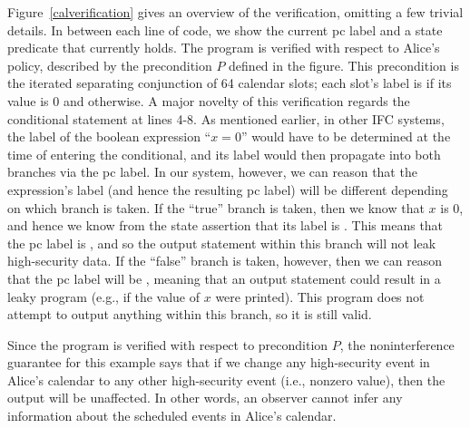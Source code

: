 Figure~\ref{calverification} gives an overview of the verification, omitting a few trivial details. In between each line of
code, we show the current pc label and a state predicate that currently holds.
The program is verified with respect to Alice's policy, described by the precondition $P$ defined in the figure. 
This precondition is the iterated separating conjunction of 64 calendar slots; each slot's label is \lo{} if its value is
0 and \hi{} otherwise. A major novelty of this verification regards the conditional statement at lines 4-8.
As mentioned earlier, in other IFC systems, the label of the boolean expression ``$x = 0$'' would have to be determined at 
the time of entering the conditional, and its label would then propagate into both branches via the pc label. In our system, 
however, we can reason that the expression's label (and hence the resulting pc label) will be 
different depending on which branch is taken. If the ``true'' branch is taken, then we know that $x$ is 0, and hence we know 
from the state assertion that its label is \lo{}. This means that the pc label is \lo{}, and so the output statement within 
this branch will not leak high-security data. If the ``false'' branch is taken, however, then we can reason that the pc label 
will be \hi{}, meaning that an output statement could result in a leaky program (e.g., if the value of $x$ were printed). This 
program does not attempt to output anything within this branch, so it is still valid.

Since the program is verified with respect to precondition $P$, the noninterference guarantee for this example says that if 
we change any high-security event in Alice's calendar to any other high-security event (i.e., nonzero value), then the output 
will be unaffected. In other words, an observer cannot infer any information about the scheduled events 
in Alice's calendar.

